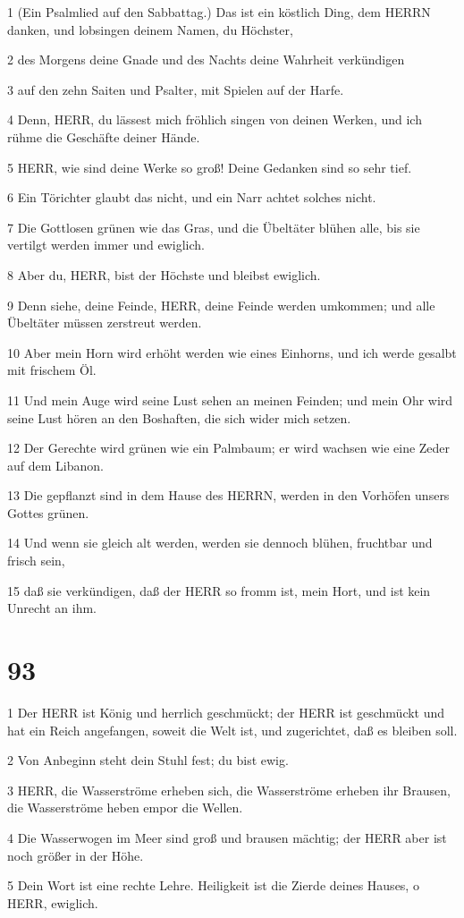 \par 1 (Ein Psalmlied auf den Sabbattag.) Das ist ein köstlich Ding, dem HERRN danken, und lobsingen deinem Namen, du Höchster,
\par 2 des Morgens deine Gnade und des Nachts deine Wahrheit verkündigen
\par 3 auf den zehn Saiten und Psalter, mit Spielen auf der Harfe.
\par 4 Denn, HERR, du lässest mich fröhlich singen von deinen Werken, und ich rühme die Geschäfte deiner Hände.
\par 5 HERR, wie sind deine Werke so groß! Deine Gedanken sind so sehr tief.
\par 6 Ein Törichter glaubt das nicht, und ein Narr achtet solches nicht.
\par 7 Die Gottlosen grünen wie das Gras, und die Übeltäter blühen alle, bis sie vertilgt werden immer und ewiglich.
\par 8 Aber du, HERR, bist der Höchste und bleibst ewiglich.
\par 9 Denn siehe, deine Feinde, HERR, deine Feinde werden umkommen; und alle Übeltäter müssen zerstreut werden.
\par 10 Aber mein Horn wird erhöht werden wie eines Einhorns, und ich werde gesalbt mit frischem Öl.
\par 11 Und mein Auge wird seine Lust sehen an meinen Feinden; und mein Ohr wird seine Lust hören an den Boshaften, die sich wider mich setzen.
\par 12 Der Gerechte wird grünen wie ein Palmbaum; er wird wachsen wie eine Zeder auf dem Libanon.
\par 13 Die gepflanzt sind in dem Hause des HERRN, werden in den Vorhöfen unsers Gottes grünen.
\par 14 Und wenn sie gleich alt werden, werden sie dennoch blühen, fruchtbar und frisch sein,
\par 15 daß sie verkündigen, daß der HERR so fromm ist, mein Hort, und ist kein Unrecht an ihm.

\chapter{93}

\par 1 Der HERR ist König und herrlich geschmückt; der HERR ist geschmückt und hat ein Reich angefangen, soweit die Welt ist, und zugerichtet, daß es bleiben soll.
\par 2 Von Anbeginn steht dein Stuhl fest; du bist ewig.
\par 3 HERR, die Wasserströme erheben sich, die Wasserströme erheben ihr Brausen, die Wasserströme heben empor die Wellen.
\par 4 Die Wasserwogen im Meer sind groß und brausen mächtig; der HERR aber ist noch größer in der Höhe.
\par 5 Dein Wort ist eine rechte Lehre. Heiligkeit ist die Zierde deines Hauses, o HERR, ewiglich.

